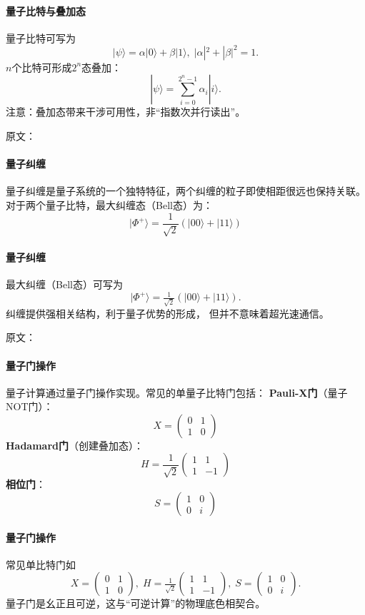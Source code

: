 \paragraph{量子比特与叠加态}
量子比特可写为
$$|\psi\rangle=\alpha|0\rangle+\beta|1\rangle,\;|\alpha|^2+|\beta|^2=1.$$
$n$个比特可形成$2^n$态叠加：
$$|\psi\rangle=\sum_{i=0}^{2^n-1}\alpha_i|i\rangle.$$
注意：叠加态带来干涉可用性，非“指数次并行读出”。

原文：
\paragraph{量子纠缠}
量子纠缠是量子系统的一个独特特征，两个纠缠的粒子即使相距很远也保持关联。对于两个量子比特，最大纠缠态（Bell态）为：
$$|\Phi^+\rangle = \frac{1}{\sqrt{2}}(|00\rangle + |11\rangle)$$
\paragraph{量子纠缠}
最大纠缠（Bell态）可写为
$$|\Phi^+\rangle=\tfrac{1}{\sqrt{2}}(|00\rangle+|11\rangle).$$
纠缠提供强相关结构，利于量子优势的形成，  
但并不意味着超光速通信。

原文：
\paragraph{量子门操作}
量子计算通过量子门操作实现。常见的单量子比特门包括：
\textbf{Pauli-X门}（量子NOT门）：
$$X = \begin{pmatrix} 0 & 1 \\ 1 & 0 \end{pmatrix}$$
\textbf{Hadamard门}（创建叠加态）：
$$H = \frac{1}{\sqrt{2}}\begin{pmatrix} 1 & 1 \\ 1 & -1 \end{pmatrix}$$
\textbf{相位门}：
$$S = \begin{pmatrix} 1 & 0 \\ 0 & i \end{pmatrix}$$
\paragraph{量子门操作}
常见单比特门如
$$X=\begin{pmatrix}0&1\\1&0\end{pmatrix},\;
H=\tfrac{1}{\sqrt{2}}\begin{pmatrix}1&1\\1&-1\end{pmatrix},\;
S=\begin{pmatrix}1&0\\0&i\end{pmatrix}.$$
量子门是幺正且可逆，这与“可逆计算”的物理底色相契合。

